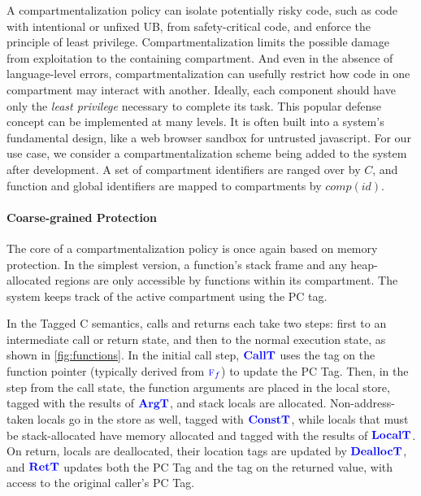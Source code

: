 \documentclass{llncs}
\begin{document}
{A compartmentalization policy can isolate potentially risky code, such as code with intentional
or unfixed UB, from safety-critical code, and enforce the principle of least privilege. 
Compartmentalization limits the possible damage from exploitation to the containing compartment.
And even in the absence of language-level errors, compartmentalization can usefully 
restrict how code in one compartment may interact with another.
Ideally, each component should have only the
{\em least privilege} necessary to complete its task.
This popular defense concept can be implemented at many levels. It is often built
into a system's fundamental design, like a web browser sandbox for untrusted javascript.
For our use case, we consider a compartmentalization scheme being added to the system
after development. A set of compartment identifiers are ranged over by \(C\),
and function and global identifiers are mapped to compartments by \(\mathit{comp}(id)\). 

\paragraph{Coarse-grained Protection}

%
The core of a compartmentalization policy is once again based on memory protection. In the simplest version, 
a function's stack frame and any heap-allocated regions are only accessible by functions within its
compartment. The system keeps track of the active compartment using the PC tag.

In the Tagged C semantics, calls and returns each take two steps: first to an intermediate call
or return state, and
then to the normal execution state, as shown in \cref{fig:functions}.
In the initial call step, \(\color{blue} \mathbf{CallT}\) uses the tag on the function pointer
(typically derived from \({\color{blue} \textnormal{\sc f}_{f}}\)) to update the PC Tag. Then, in the step from the call
state, the function arguments are placed in the local store, tagged with
the results of \(\color{blue} \mathbf{ArgT}\), and stack locals are allocated. Non-address-taken locals go in the
store as well, tagged with \(\color{blue} \mathbf{ConstT}\), while locals that must be stack-allocated have memory
allocated and tagged with the results of \(\color{blue} \mathbf{LocalT}\). 
  On return, locals are deallocated, their location tags are 
updated by \(\color{blue} \mathbf{DeallocT}\), and \(\color{blue} \mathbf{RetT}\) updates both the PC Tag and the tag on the returned value,
with access to the original caller's PC Tag.

}
\end{document}

